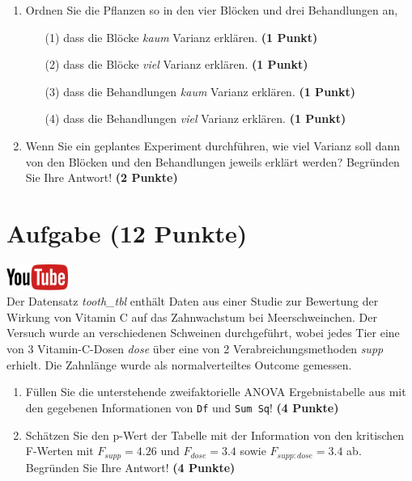 \documentclass[a4paper, 10pt]{scrartcl}\usepackage[]{graphicx}\usepackage[]{xcolor}
\begin{document}
\begin{enumerate}
\item Ordnen Sie die Pflanzen so in den vier Bl{\"o}cken und drei Behandlungen an,
  \begin{enumerate}
  \item[(1)] dass die Bl{\"o}cke \textit{kaum} Varianz erkl{\"a}ren. \textbf{(1 Punkt)}
  \item[(2)] dass die Bl{\"o}cke \textit{viel} Varianz erkl{\"a}ren. \textbf{(1 Punkt)}  
  \item[(3)] dass die Behandlungen \textit{kaum} Varianz erkl{\"a}ren. \textbf{(1 Punkt)}
  \item[(4)] dass die Behandlungen \textit{viel} Varianz erkl{\"a}ren. \textbf{(1 Punkt)}
  \end{enumerate}
\item Wenn Sie ein geplantes Experiment durchf{\"u}hren, wie viel Varianz soll dann von
  den Bl{\"o}cken und den Behandlungen jeweils erkl{\"a}rt werden? Begr{\"u}nden Sie
  Ihre Antwort! \textbf{(2 Punkte)}
\end{enumerate}
 
\clearpage

\section{Aufgabe \hfill (12 Punkte)}

\hfill\href{https://youtu.be/8Pb2sKUIMyk}{\includegraphics[width =
  2cm]{img/youtube}}\\[1Ex]



Der Datensatz \textit{tooth\_tbl} enth{\"a}lt Daten aus einer Studie zur
Bewertung der Wirkung von Vitamin C auf das Zahnwachstum bei
Meerschweinchen. Der Versuch wurde an verschiedenen Schweinen durchgef{\"u}hrt,
wobei jedes Tier eine von 3 Vitamin-C-Dosen \textit{dose}
{\"u}ber eine von 2 Verabreichungsmethoden \textit{supp}
erhielt. Die Zahnl{\"a}nge wurde als normalverteiltes Outcome gemessen.



\begin{enumerate}
\item F{\"u}llen Sie die unterstehende zweifaktorielle ANOVA Ergebnistabelle aus
  mit den gegebenen Informationen von \texttt{Df} und \texttt{Sum Sq}!
  \textbf{(4 Punkte)}
\item Sch{\"a}tzen Sie den p-Wert der Tabelle mit der Information von den
  kritischen F-Werten mit
  $F_{supp} = 4.26$ und
  $F_{dose} = 3.4$ sowie
  $F_{supp:dose} = 3.4$ ab. Begr{\"u}nden Sie Ihre
  Antwort! \textbf{(4 Punkte)}
\end{enumerate}
\end{document}
